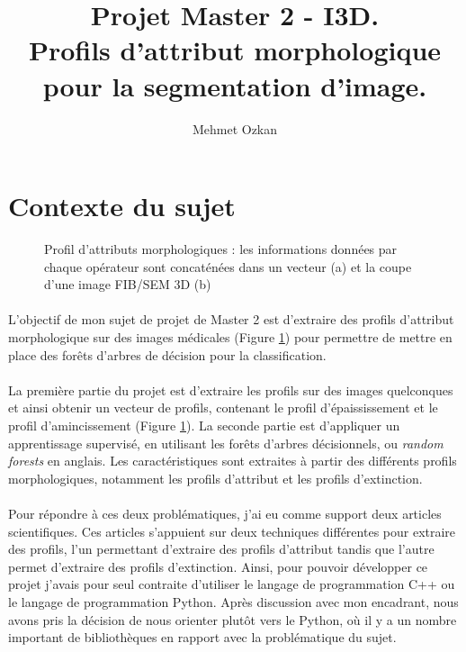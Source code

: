 \documentclass[paper=a4, 11pt]{article}
\title{Projet Master 2 - I3D.\\
Profils d'attribut morphologique pour la segmentation d’image.}
\author{Mehmet Ozkan}
\begin{document}
\maketitle

\paragraph{}

\section{Contexte du sujet}

\begin{figure}[h]
\centering
{}
\qquad
{}
\caption{Profil d’attributs morphologiques : les informations données par chaque opérateur sont concaténées dans un vecteur (a) et la coupe d’une image FIB/SEM 3D (b)}
\label{fig:contexte}
\end{figure}

\paragraph{} L'objectif de mon sujet de projet de Master 2 est d'extraire des profils d'attribut morphologique sur des images médicales (Figure \ref{fig:contexte}) pour permettre de mettre en place des forêts d'arbres de décision pour la classification.
\paragraph{} La première partie du projet est d'extraire les profils sur des images quelconques et ainsi obtenir un vecteur de profils, contenant le profil d'épaississement et le profil d'amincissement (Figure \ref{fig:contexte}). La seconde partie est d'appliquer un apprentissage supervisé, en utilisant les forêts d'arbres décisionnels, ou \textit{random forests} en anglais. Les caractéristiques sont extraites à partir des différents profils morphologiques, notamment les profils d'attribut et les profils d'extinction.
\paragraph{} Pour répondre à ces deux problématiques, j'ai eu comme support deux articles scientifiques\cite{article1, article2}. Ces articles s'appuient sur deux techniques différentes pour extraire des profils, l'un permettant d'extraire des profils d'attribut tandis que l'autre permet d'extraire des profils d'extinction. Ainsi, pour pouvoir développer ce projet j'avais pour seul contraite d'utiliser le langage de programmation C++ ou le langage de programmation Python. Après discussion avec mon encadrant, nous avons pris la décision de nous orienter plutôt vers le Python, où il y a un nombre important de bibliothèques en rapport avec la problématique du sujet.
\end{document}
